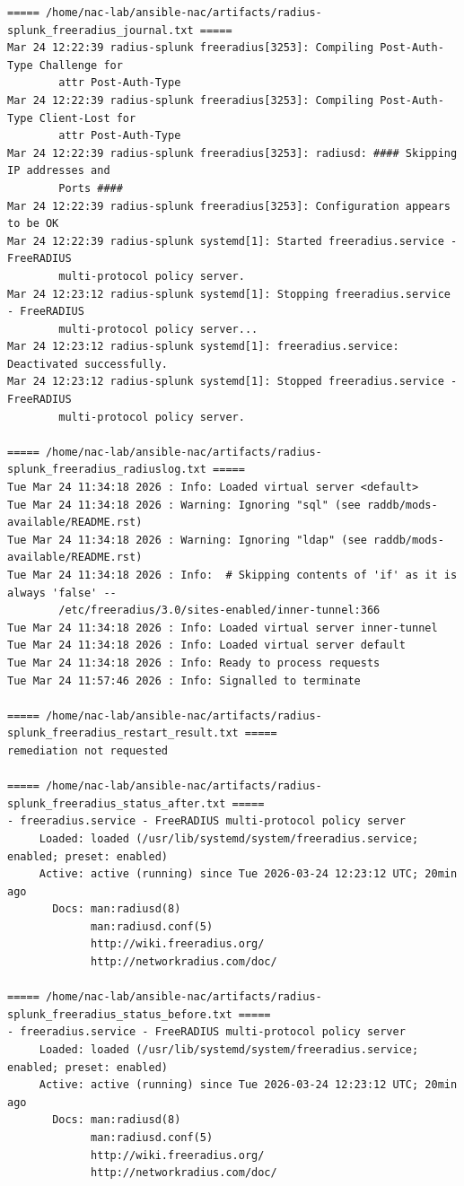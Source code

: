 \documentclass[11pt]{article}
\begin{document}
\begin{verbatim}
===== /home/nac-lab/ansible-nac/artifacts/radius-splunk_freeradius_journal.txt =====
Mar 24 12:22:39 radius-splunk freeradius[3253]: Compiling Post-Auth-Type Challenge for 
        attr Post-Auth-Type
Mar 24 12:22:39 radius-splunk freeradius[3253]: Compiling Post-Auth-Type Client-Lost for 
        attr Post-Auth-Type
Mar 24 12:22:39 radius-splunk freeradius[3253]: radiusd: #### Skipping IP addresses and 
        Ports ####
Mar 24 12:22:39 radius-splunk freeradius[3253]: Configuration appears to be OK
Mar 24 12:22:39 radius-splunk systemd[1]: Started freeradius.service - FreeRADIUS 
        multi-protocol policy server.
Mar 24 12:23:12 radius-splunk systemd[1]: Stopping freeradius.service - FreeRADIUS 
        multi-protocol policy server...
Mar 24 12:23:12 radius-splunk systemd[1]: freeradius.service: Deactivated successfully.
Mar 24 12:23:12 radius-splunk systemd[1]: Stopped freeradius.service - FreeRADIUS 
        multi-protocol policy server.

===== /home/nac-lab/ansible-nac/artifacts/radius-splunk_freeradius_radiuslog.txt =====
Tue Mar 24 11:34:18 2026 : Info: Loaded virtual server <default>
Tue Mar 24 11:34:18 2026 : Warning: Ignoring "sql" (see raddb/mods-available/README.rst)
Tue Mar 24 11:34:18 2026 : Warning: Ignoring "ldap" (see raddb/mods-available/README.rst)
Tue Mar 24 11:34:18 2026 : Info:  # Skipping contents of 'if' as it is always 'false' --
        /etc/freeradius/3.0/sites-enabled/inner-tunnel:366
Tue Mar 24 11:34:18 2026 : Info: Loaded virtual server inner-tunnel
Tue Mar 24 11:34:18 2026 : Info: Loaded virtual server default
Tue Mar 24 11:34:18 2026 : Info: Ready to process requests
Tue Mar 24 11:57:46 2026 : Info: Signalled to terminate

===== /home/nac-lab/ansible-nac/artifacts/radius-splunk_freeradius_restart_result.txt =====
remediation not requested

===== /home/nac-lab/ansible-nac/artifacts/radius-splunk_freeradius_status_after.txt =====
- freeradius.service - FreeRADIUS multi-protocol policy server
     Loaded: loaded (/usr/lib/systemd/system/freeradius.service; enabled; preset: enabled)
     Active: active (running) since Tue 2026-03-24 12:23:12 UTC; 20min ago
       Docs: man:radiusd(8)
             man:radiusd.conf(5)
             http://wiki.freeradius.org/
             http://networkradius.com/doc/

===== /home/nac-lab/ansible-nac/artifacts/radius-splunk_freeradius_status_before.txt =====
- freeradius.service - FreeRADIUS multi-protocol policy server
     Loaded: loaded (/usr/lib/systemd/system/freeradius.service; enabled; preset: enabled)
     Active: active (running) since Tue 2026-03-24 12:23:12 UTC; 20min ago
       Docs: man:radiusd(8)
             man:radiusd.conf(5)
             http://wiki.freeradius.org/
             http://networkradius.com/doc/


\end{verbatim}
\end{document}
